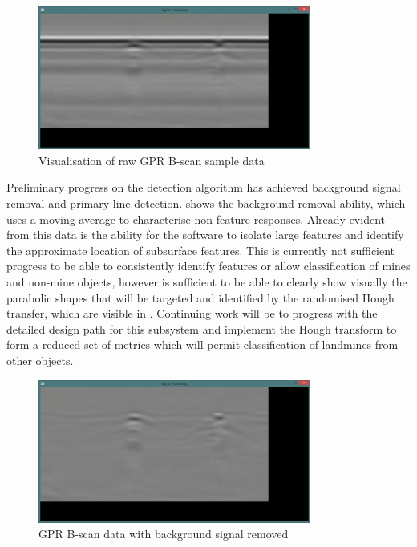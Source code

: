 \documentclass[main.tex]{subfiles}
\begin{document}
\begin{figure}[ht]
\includegraphics[width=0.8\textwidth]{7-Conclusion/raw.png}
\centering
\caption{Visualisation of raw GPR B-scan sample data}
\end{figure}
Preliminary progress on the detection algorithm has achieved background signal removal and primary line detection.  shows the background removal ability, which uses a moving average to characterise non-feature responses. Already evident from this data is the ability for the software to isolate large features and identify the approximate location of subsurface features. This is currently not sufficient progress to be able to consistently identify features or allow classification of mines and non-mine objects, however is sufficient to be able to clearly show visually the parabolic shapes that will be targeted and identified by the randomised Hough transfer, which are visible in . Continuing work will be to progress with the detailed design path for this subsystem and implement the Hough transform to form a reduced set of metrics which will permit classification of landmines from other objects.

\begin{figure}[ht]
\includegraphics[width=0.8\textwidth]{7-Conclusion/bg-removed.png}
\centering
\caption{GPR B-scan data with background signal removed}
\end{figure}
\end{document}
